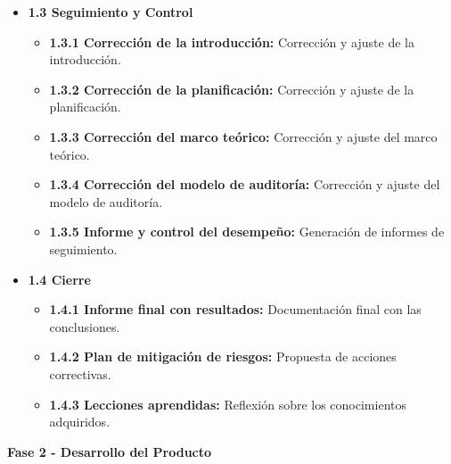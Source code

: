 \documentclass[a4paper, 10pt]{article}
\begin{document}
\begin{itemize}
    \item \textbf{1.3 Seguimiento y Control}
    \begin{itemize}
        \item \textbf{1.3.1 Corrección de la introducción:} Corrección y ajuste de la introducción.
        \item \textbf{1.3.2 Corrección de la planificación:} Corrección y ajuste de la planificación.
        \item \textbf{1.3.3 Corrección del marco teórico:} Corrección y ajuste del marco teórico.
        \item \textbf{1.3.4 Corrección del modelo de auditoría:} Corrección y ajuste del modelo de auditoría.
        \item \textbf{1.3.5 Informe y control del desempeño:} Generación de informes de seguimiento.
    \end{itemize}

    \item \textbf{1.4 Cierre}
    \begin{itemize}
        \item \textbf{1.4.1 Informe final con resultados:} Documentación final con las conclusiones.
        \item \textbf{1.4.2 Plan de mitigación de riesgos:} Propuesta de acciones correctivas.
        \item \textbf{1.4.3 Lecciones aprendidas:} Reflexión sobre los conocimientos adquiridos.
    \end{itemize}
\end{itemize}

\vspace{0.5cm}
\textbf{\large Fase 2 - Desarrollo del Producto} \vspace{0.5cm}
\end{document}
